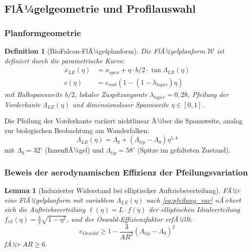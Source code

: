 ﻿\documentclass[12pt,a4paper]{article}
\newtheorem{lemma}[theorem]{Lemma}
\newtheorem{definition}{Definition}[section]
\theoremstyle{remark}
\begin{document}
	\subsection{FlÃ¼gelgeometrie und Profilauswahl}
	\label{sec:fluegel}
	
	\subsubsection{Planformgeometrie}
	
	\begin{definition}[BioFalcon-FlÃ¼gelplanform]
		\label{def:planform}
		Die FlÃ¼gelplanform $\mathcal{W}$ ist definiert durch die parametrische Kurve:
		\begin{align}
			x_{LE}(\eta) &= x_{apex} + \eta \cdot b/2 \cdot \tan\Lambda_{LE}(\eta) \\
			c(\eta)      &= c_{root}\left(1 - (1-\lambda_{taper})\eta\right)
		\end{align}
		mit Halbspannweite $b/2$, lokaler Zuspitzungsrate $\lambda_{taper} = 0{,}28$,
		Pfeilung der Vorderkante $\Lambda_{LE}(\eta)$ und dimensionsloser Spannweite
		$\eta \in [0,1]$.
	\end{definition}
	
	Die Pfeilung der Vorderkante variiert nichtlinear Ã¼ber die Spannweite, analog
	zur biologischen Beobachtung am Wanderfalken:
	\begin{equation}
		\Lambda_{LE}(\eta) = \Lambda_0 + (\Lambda_{tip} - \Lambda_0)\eta^{1{,}4}
		\label{eq:pfeilung_var}
	\end{equation}
	mit $\Lambda_0 = 32^{\circ}$ (InnenflÃ¼gel) und
	$\Lambda_{tip} = 58^{\circ}$ (Spitze im gefalteten Zustand).
	
	\subsubsection{Beweis der aerodynamischen Effizienz der Pfeilungsvariation}
	
	\begin{lemma}[Induzierter Widerstand bei elliptischer Auftriebsverteilung]
		\label{lem:oswald}
		FÃ¼r eine FlÃ¼gelplanform mit variablem $\Lambda_{LE}(\eta)$ nach
		\cref{eq:pfeilung_var} nÃ¤hert sich die Auftriebsverteilung
		$\ell(\eta) = L \cdot f(\eta)$ der elliptischen Idealverteilung
		$f_{ell}(\eta) = \tfrac{4}{\pi}\sqrt{1-\eta^2}$, und der Oswald-Effizienzfaktor
		erfÃ¼llt:
		\begin{equation}
			e_{Oswald} \geq 1 - \frac{3}{AR^2}\left(\Lambda_{tip} - \Lambda_0\right)^2
			\label{eq:oswald_bound}
		\end{equation}
		fÃ¼r $AR \geq 6$.
	\end{lemma}
	
\end{document}
